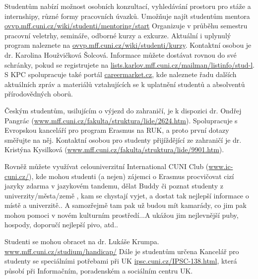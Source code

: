 Studentům nabízí možnost osobních konzultací, vyhledávání prostoru pro stáže a
internshipy, různé formy pracovních úvazků. Umožňuje najít studentům mentora
\url{ovvp.mff.cuni.cz/wiki/studenti/mentoring/start} Organizuje v průběhu
semestru pracovní veletrhy, semináře, odborné kurzy a exkurze. Aktuální i
uplynulý program naleznete na \url{ovvp.mff.cuni.cz/wiki/studenti/kurzy}.
Kontaktní osobou je dr. Karolina Houžvičková Šolcová. Informace můžete dostávat
rovnou do své schránky, pokud se registrujete na
\url{lists.karlov.mff.cuni.cz/mailman/listinfo/stud-l}. S KPC spolupracuje také
portál \url{careermarket.cz}, kde naleznete řadu dalších aktuálních zpráv a
materiálů vztahujících se k uplatnění studentů a absolventů přírodovědných
oborů.


Českým studentům, usilujícím o výjezd do zahraničí, je k dispozici dr. Ondřej
Pangrác (\url{www.mff.cuni.cz/fakulta/struktura/lide/2624.htm}). Spolupracuje s
Evropskou kanceláří pro program Erasmus na RUK, a proto první dotazy směřujte na
něj. Kontaktní osobou pro studenty přijíždějící ze zahraničí je dr. Kristýna
Kysilková (\url{www.mff.cuni.cz/fakulta/struktura/lide/9901.htm}).

Rovněž můžete využívat celouniverzitní International CUNI Club
(\url{www.ic-cuni.cz/}), kde mohou studenti (a nejen) zájemci o Erasmus
procvičovat cizí jazyky zdarma v jazykovém tandemu, dělat Buddy či poznat
studenty z univerzity/města/země , kam se chystají vyjet, a dostat tak nejlepší
informace o místě a univerzitě.. A samozřejmě tam pak už budou mít kamarády, co
jim pak mohou pomoci v novém kulturním prostředí...A ukážou jim nejlevnější
puby, hospody, doporučí nejlepší pivo, atd..


Studenti se mohou obracet na dr. Lukáše Krumpa.
\url{www.mff.cuni.cz/studium/handicap/} Dále je studentům určena Kancelář pro
studenty se speciálními potřebami při UK \url{ipsc.cuni.cz/IPSC-138.html}, která
působí při Informačním, poradenském a sociálním centru UK.
